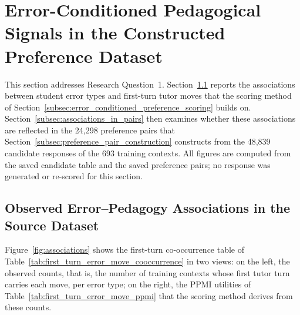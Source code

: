 \section{Error-Conditioned Pedagogical Signals in the Constructed Preference Dataset}\label{sec:preference_signal_results}
This section addresses Research Question~1. Section~\ref{subsec:observed_associations} reports the associations between student error types and first-turn tutor moves that the scoring method of Section~\ref{subsec:error_conditioned_preference_scoring} builds on. Section~\ref{subsec:associations_in_pairs} then examines whether these associations are reflected in the 24,298 preference pairs that Section~\ref{subsec:preference_pair_construction} constructs from the 48,839 candidate responses of the 693 training contexts. All figures are computed from the saved candidate table and the saved preference pairs; no response was generated or re-scored for this section.

\subsection{Observed Error--Pedagogy Associations in the Source Dataset}\label{subsec:observed_associations}
Figure~\ref{fig:associations} shows the first-turn co-occurrence table of Table~\ref{tab:first_turn_error_move_cooccurrence} in two views: on the left, the observed counts, that is, the number of training contexts whose first tutor turn carries each move, per error type; on the right, the PPMI utilities of Table~\ref{tab:first_turn_error_move_ppmi} that the scoring method derives from these counts.

